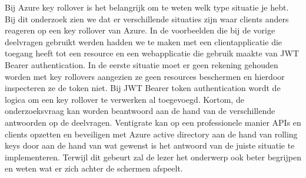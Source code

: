 Bij Azure key rollover is het belangrijk om te weten welk type situatie je hebt. Bij dit onderzoek zien we dat er verschillende situaties zijn waar clients anders reageren op een key rollover van Azure. In de voorbeelden die bij de vorige deelvragen gebruikt werden hadden we te maken met een clientapplicatie die toegang heeft tot een resource en een webapplicatie die gebruik maakte van JWT Bearer authentication. In de eerste situatie moet er geen rekening gehouden worden met key rollovers aangezien ze geen resources beschermen en hierdoor inspecteren ze de token niet. Bij JWT Bearer token authentication wordt de logica om een key rollover te verwerken al toegevoegd.\newline\newline
Kortom, de onderzoeksvraag kan worden beantwoord aan de hand van de verschillende antwoorden op de deelvragen. Ventigrate kan op een professionele manier APIs en clients opzetten en beveiligen met Azure active directory aan de hand van rolling keys door aan de hand van wat gewenst is het antwoord van de juiste situatie te implementeren. Terwijl dit gebeurt zal de lezer het onderwerp ook beter begrijpen en weten wat er zich achter de schermen afspeelt. 

